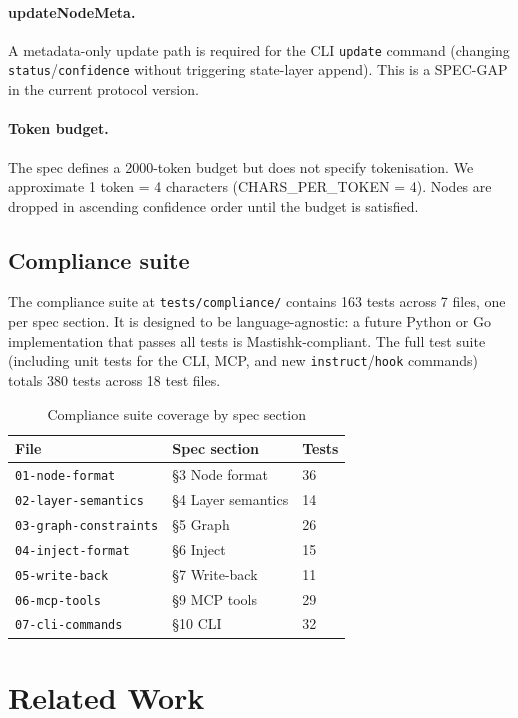 \documentclass[11pt]{article}
\begin{document}
\paragraph{updateNodeMeta.}
A metadata-only update path is required for the CLI \texttt{update} command (changing \texttt{status}/\texttt{confidence} without triggering state-layer append). This is a SPEC-GAP in the current protocol version.

\paragraph{Token budget.}
The spec defines a 2000-token budget but does not specify tokenisation. We approximate 1 token = 4 characters (CHARS\_PER\_TOKEN = 4). Nodes are dropped in ascending confidence order until the budget is satisfied.

\subsection{Compliance suite}

The compliance suite at \texttt{tests/compliance/} contains 163 tests across 7 files, one per spec section. It is designed to be language-agnostic: a future Python or Go implementation that passes all tests is Mastishk-compliant. The full test suite (including unit tests for the CLI, MCP, and new \texttt{instruct}/\texttt{hook} commands) totals 380 tests across 18 test files.

\begin{table}[H]
\centering
\begin{tabular}{lll}
\toprule
File & Spec section & Tests \\
\midrule
\texttt{01-node-format} & \S3 Node format & 36 \\
\texttt{02-layer-semantics} & \S4 Layer semantics & 14 \\
\texttt{03-graph-constraints} & \S5 Graph & 26 \\
\texttt{04-inject-format} & \S6 Inject & 15 \\
\texttt{05-write-back} & \S7 Write-back & 11 \\
\texttt{06-mcp-tools} & \S9 MCP tools & 29 \\
\texttt{07-cli-commands} & \S10 CLI & 32 \\
\bottomrule
\end{tabular}
\caption{Compliance suite coverage by spec section}
\end{table}

\section{Related Work}
\label{sec:related}
\end{document}
